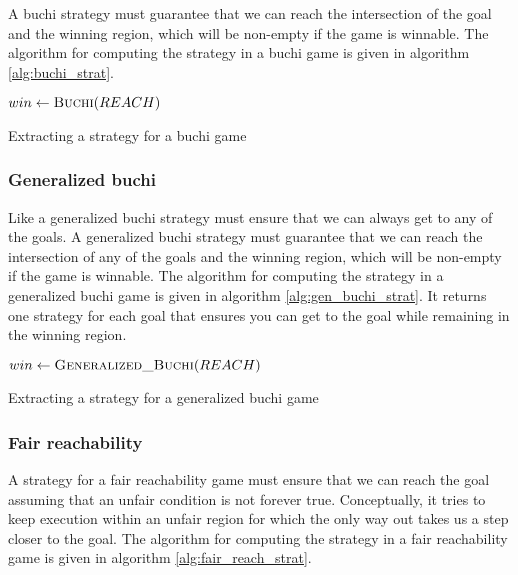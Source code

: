 \documentclass{book}
\theoremstyle{definition}
\begin{document}
A buchi strategy must guarantee that we can reach the intersection of the goal and the winning region, which will be non-empty if the game is winnable. The algorithm for computing the strategy in a buchi game is given in algorithm \ref{alg:buchi_strat}.

\begin{algorithm}[t]
\begin{algorithmic}
\State $win \gets \Call{Buchi}{REACH}$
\State \Return {}
\EndFunction
\end{algorithmic}
\caption{Extracting a strategy for a buchi game}
\label{alg:buchi_strat}
\end{algorithm}

\subsubsection{Generalized buchi}

Like a generalized buchi strategy must ensure that we can always get to any of the goals. A generalized buchi strategy must guarantee that we can reach the intersection of any of the goals and the winning region, which will be non-empty if the game is winnable. The algorithm for computing the strategy in a generalized buchi game is given in algorithm \ref{alg:gen_buchi_strat}. It returns one strategy for each goal that ensures you can get to the goal while remaining in the winning region. 

\begin{algorithm}[t]
\begin{algorithmic}
\State $win \gets \Call{Generalized\_Buchi}{REACH}$

\State \Return {}
\EndFor

\EndFunction
\end{algorithmic}
\caption{Extracting a strategy for a generalized buchi game}
\label{alg:gen_buchi_strat}
\end{algorithm}

\subsubsection{Fair reachability}

A strategy for a fair reachability game must ensure that we can reach the goal assuming that an unfair condition is not forever true. Conceptually, it tries to keep execution within an unfair region for which the only way out takes us a step closer to the goal. The algorithm for computing the strategy in a fair reachability game is given in algorithm \ref{alg:fair_reach_strat}.
\end{document}
